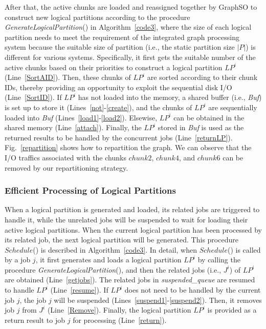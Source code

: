 \documentclass[10pt,journal,compsoc]{IEEEtran}
\begin{document}
After that, the active chunks are loaded and reassigned together by GraphSO to construct new logical partitions according to the procedure \textit{GenerateLogicalPartition}() in Algorithm~\ref{code3}, where the size of each logical partition needs to meet the requirement of the integrated graph processing system because the suitable size of partition (i.e., the static partition size $|P|$) is different for various systems.
Specifically, it first gets the suitable number of the active chunks based on their priorities to construct a logical partition $LP^i$ (Line~\ref{SortAID}).
Then, these chunks of $LP^i$ are sorted according to their chunk IDs, thereby providing an opportunity to exploit the sequential disk I/O (Line~\ref{SortID}).
If $LP^i$ has not loaded into the memory, a shared buffer (i.e., \textit{Buf}) is set up to store it (Lines~\ref{not}-\ref{create}), and the chunks of $LP^i$ are sequentially loaded into \textit{Buf} (Lines~\ref{load1}-\ref{load2}). Elsewise, $LP^i$ can be obtained in the shared memory (Line~\ref{attach}).
Finally, the $LP^i$ stored in \textit{Buf} is used as the returned results to be handled by the concurrent jobs (Line~\ref{returnLP}). Fig.~\ref{repartition} shows how to repartition the graph. We can observe that the I/O traffics associated with the chunks $chunk 2$, $chunk 4$, and $chunk 6$ can be removed by our repartitioning strategy.


\vspace{-6pt}
\subsubsection{Efficient Processing of Logical Partitions}\label{section:Scheduling}
\vspace{-2pt}

When a logical partition is generated and loaded, its related jobs are triggered to handle it, while the unrelated jobs will be suspended to wait for loading their active logical partitions. When the current logical partition has been processed by its related job, the next logical partition will be generated.
This procedure $Schedule$() is described in Algorithm~\ref{code3}.
In detail, when $Schedule$() is called by a job $j$, it first generates and loads a logical partition $LP^i$ by calling the procedure \textit{GenerateLogicalPartition}(), and then the related jobs (i.e., $J^i$) of $LP^i$ are obtained (Line~\ref{getjobs}).
The related jobs in \emph{suspended\_queue} are resumed to handle $LP^i$ (Line~\ref{resume}).
If $LP^i$ does not need to be handled by the current job $j$, the job $j$ will be suspended (Lines~\ref{suspend1}-\ref{suspend2}).
Then, it removes job $j$ from $J^i$ (Line~\ref{Remove}).
Finally, the logical partition $LP^i$ is provided as a return result to job $j$ for processing (Line~\ref{return}).
\end{document}
